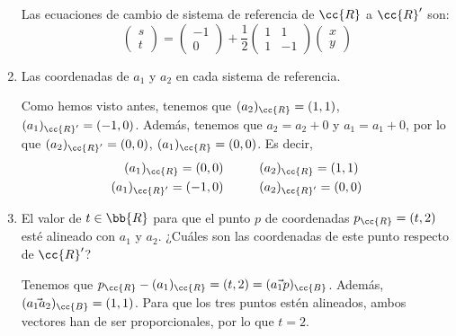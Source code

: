 \begin{ejercicio}
\begin{enumerate}
        Las ecuaciones de cambio de sistema de referencia de $\cc{R}$ a $\cc{R}'$ son:
        \begin{equation*}
            \left(\begin{array}{c}
                s \\ t
            \end{array}\right)
            = 
            \left(\begin{array}{c}
                -1\\ 0
            \end{array}\right)
            +
            \frac{1}{2}\left(\begin{array}{ccc}
                1 & 1 \\
                1 & -1
            \end{array}\right)
            \left(\begin{array}{c}
                x \\ y
            \end{array}\right)
        \end{equation*}
        
        \item Las coordenadas de $a_1$ y $a_2$ en cada sistema de referencia.

        Como hemos visto antes, tenemos que $(a_2)_{\cc{R}} = (1,1)$, $(a_1)_{\cc{R}'} = (-1,0)$. Además, tenemos que $a_2=a_2+0$ y $a_1=a_1+0$, por lo que $(a_2)_{\cc{R}'} = (0,0)$, $(a_1)_{\cc{R}} = (0,0)$. Es decir,
        \begin{equation*}\begin{split}
            (a_1)_{\cc{R}} = (0,0) &\hspace{1cm} (a_2)_{\cc{R}} = (1,1) \\
            (a_1)_{\cc{R}'} = (-1,0) &\hspace{1cm} (a_2)_{\cc{R}'} = (0,0) \\
        \end{split}\end{equation*}
        
        \item El valor de $t \in \bb{R}$ para que el punto $p$ de coordenadas $p_\cc{R} = (t, 2)$ esté alineado con $a_1$ y $a_2$. ¿Cuáles son las coordenadas de este punto respecto de $\cc{R}'$?

        Tenemos que $p_{\cc{R}}-(a_1)_{\cc{R}}=(t,2)=(\vec{a_1p})_{\cc{B}}$. Además, $(\vec{a_1a_2})_{\cc{B}}=(1,1)$. Para que los tres puntos estén alineados, ambos vectores han de ser proporcionales, por lo que $t=2$.


\end{enumerate}
\end{ejercicio}
